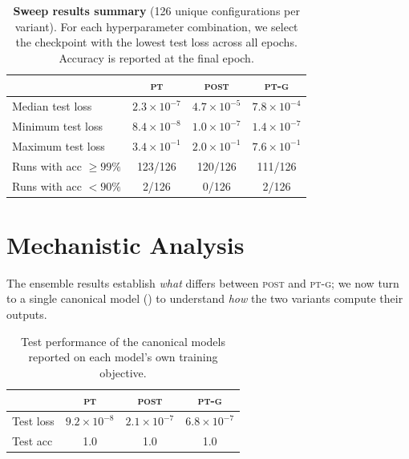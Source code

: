 \documentclass[10pt, letterpaper]{article}
\newcommand{\PT}{\textsc{pt}}
\newcommand{\POST}{\textsc{post}}
\newcommand{\PTG}{\textsc{pt-g}}
\begin{document}
\begin{table}[h]
  \centering
  \begin{tabular}{lccc}
    \toprule
    & \PT & \POST & \PTG \\
    \midrule
    Median test loss  & $2.3 \times 10^{-7}$ & $4.7 \times 10^{-5}$ & $7.8 \times 10^{-4}$ \\
    Minimum test loss   & $8.4 \times 10^{-8}$ & $1.0 \times 10^{-7}$ & $1.4 \times 10^{-7}$ \\
    Maximum test loss   & $3.4 \times 10^{-1}$ & $2.0 \times 10^{-1}$ & $7.6 \times 10^{-1}$ \\
    \midrule
    Runs with acc $\geq 99\%$   & 123/126 & 120/126 & 111/126 \\
    Runs with acc $< 90\%$      & 2/126   & 0/126   & 2/126 \\
    \bottomrule
  \end{tabular}
  \caption{\textbf{Sweep results summary} (126 unique configurations per variant). For each hyperparameter combination, we select the checkpoint with the lowest test loss across all epochs. Accuracy is reported at the final epoch.}
  \label{tab:sweep_results}
\end{table}

\section{Mechanistic Analysis}
\label{sec:analysis}

The ensemble results establish \emph{what} differs between \POST{} and \PTG; we now turn to a single canonical model () to understand \emph{how} the two variants compute their outputs.

\begin{table}[h]
  \centering
  \begin{tabular}{lccc}
    \toprule
                    & \PT     & \POST    & \PTG    \\
    \midrule
    Test loss       & $9.2 \times 10^{-8}$ & $2.1 \times 10^{-7}$ & $6.8 \times 10^{-7}$ \\
    Test acc        & 1.0     & 1.0      & 1.0     \\
    \bottomrule
  \end{tabular}
  \caption{Test performance of the canonical models reported on each model's own training objective.}
  \label{tab:test_performance}
\end{table}
\end{document}
